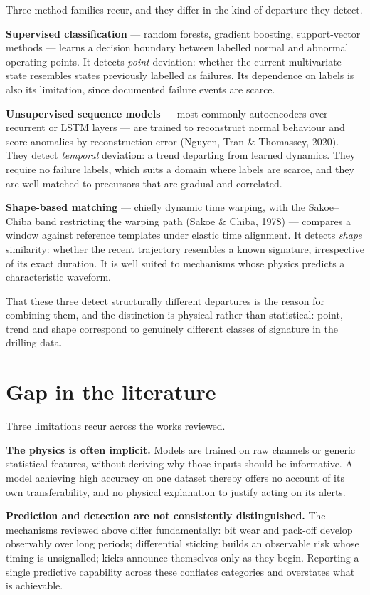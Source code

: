 \documentclass[12pt,a4paper]{report}
\begin{document}
Three method families recur, and they differ in the kind of departure they detect.

\textbf{Supervised classification} --- random forests, gradient boosting, support-vector methods --- learns a
decision boundary between labelled normal and abnormal operating points. It detects \emph{point} deviation:
whether the current multivariate state resembles states previously labelled as failures. Its dependence
on labels is also its limitation, since documented failure events are scarce.

\textbf{Unsupervised sequence models} --- most commonly autoencoders over recurrent or LSTM layers --- are trained
to reconstruct normal behaviour and score anomalies by reconstruction error (Nguyen, Tran \& Thomassey,
2020). They detect \emph{temporal} deviation: a trend departing from learned dynamics. They require no failure
labels, which suits a domain where labels are scarce, and they are well matched to precursors that are
gradual and correlated.

\textbf{Shape-based matching} --- chiefly dynamic time warping, with the Sakoe--Chiba band restricting the warping
path (Sakoe \& Chiba, 1978) --- compares a window against reference templates under elastic time alignment.
It detects \emph{shape} similarity: whether the recent trajectory resembles a known signature, irrespective of
its exact duration. It is well suited to mechanisms whose physics predicts a characteristic waveform.

That these three detect structurally different departures is the reason for combining them, and the
distinction is physical rather than statistical: point, trend and shape correspond to genuinely different
classes of signature in the drilling data.

\section{Gap in the literature}

Three limitations recur across the works reviewed.

\textbf{The physics is often implicit.} Models are trained on raw channels or generic statistical features,
without deriving why those inputs should be informative. A model achieving high accuracy on one dataset
thereby offers no account of its own transferability, and no physical explanation to justify acting on its
alerts.

\textbf{Prediction and detection are not consistently distinguished.} The mechanisms reviewed above differ
fundamentally: bit wear and pack-off develop observably over long periods; differential sticking builds an
observable risk whose timing is unsignalled; kicks announce themselves only as they begin. Reporting a
single predictive capability across these conflates categories and overstates what is achievable.
\end{document}
